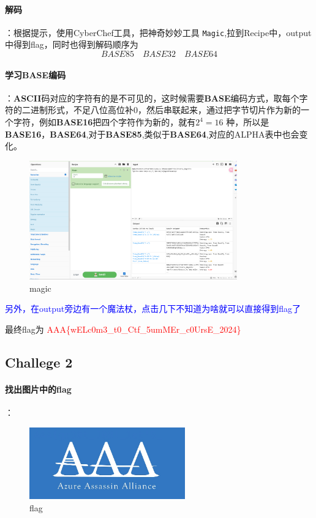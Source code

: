 \documentclass{article}
\begin{document}
\paragraph*{解码}：根据提示，使用CyberChef工具，把神奇妙妙工具 \texttt{Magic},拉到Recipe中，output中得到flag，同时也得到解码顺序为
$$ BASE85 \quad BASE32 \quad BASE64 $$
\paragraph*{学习BASE编码}：\textbf{ASCII}码对应的字符有的是不可见的，这时候需要\textbf{BASE}编码方式，取每个字符的二进制形式，不足八位高位补0，然后串联起来，通过把字节切片作为新的一个字符，例如\textbf{BASE16}把四个字符作为新的，就有$2^{4}=16$ 种，所以是\textbf{BASE16}，\textbf{BASE64},对于\textbf{BASE85},类似于\textbf{BASE64},对应的ALPHA表中也会变化。
\begin{figure}[H]
    \centering
    \includegraphics[width=0.8\textwidth]{./figure/cyberchef.png}
    \caption{magic}
\end{figure}
\textcolor{blue}{另外，在output旁边有一个魔法杖，点击几下不知道为啥就可以直接得到flag了}
\par 最终flag为\textcolor{red}{ AAA\{wELc0m3\_t0\_Ctf\_5umMEr\_c0UrsE\_2024\}}
\subsection*{Challege 2}
\paragraph*{找出图片中的flag}：
\begin{figure}[H]
    \centering
    \includegraphics[width=0.6\textwidth]{./figure/misc_challenge2.png}
    \caption{flag}
\end{figure}
\end{document}
